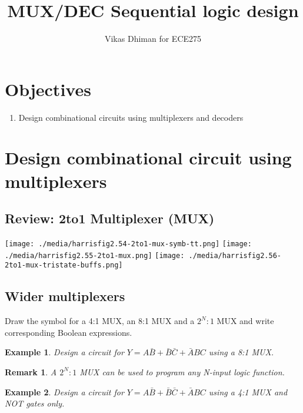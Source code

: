 \documentclass{article}
\author{Vikas Dhiman for ECE275}
\title{MUX/DEC Sequential logic design}
\newtheorem{example}{Example}
\newtheorem{remark}{Remark}
\newcommand{\bA}{\bar{A}}
\newcommand{\bB}{\bar{B}}
\newcommand{\bC}{\bar{C}}
\begin{document}
\maketitle


\section{Objectives}
\begin{enumerate}
   \item Design combinational circuits using multiplexers and decoders
\end{enumerate}

\section{Design combinational circuit using multiplexers ~\cite[Section~2.8.1]{harris2022digital}}

\subsection{Review: 2to1 Multiplexer (MUX)}
\texttt{[image: ./media/harrisfig2.54-2to1-mux-symb-tt.png]}
\texttt{[image: ./media/harrisfig2.55-2to1-mux.png]}
\texttt{[image: ./media/harrisfig2.56-2to1-mux-tristate-buffs.png]}

\subsection{Wider multiplexers}
Draw the symbol for a 4:1 MUX, an 8:1 MUX and a $2^N:1$ MUX and write
corresponding Boolean expressions.
\vspace{10em}


\begin{example}
  Design a circuit for $Y = A\bB + \bB \bC + \bA B C$ using a 8:1 MUX.
\end{example}
\vspace{10em}

\begin{remark}
  A $2^N:1$ MUX can be used to program any N-input logic function.
\end{remark}

\begin{example}
  Design a circuit for $Y = A\bB + \bB \bC + \bA B C$ using a 4:1 MUX and 
  NOT gates only.
\end{example}
\vspace{10em}
\end{document}
